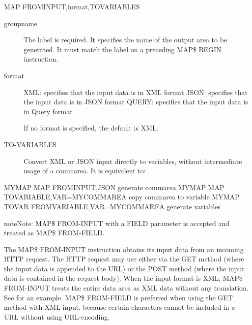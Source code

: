 \documentclass[letterpaper,10pt,english]{sphinxmanual}
\begin{document}
\begin{sphinxVerbatim}[commandchars=\\\{\}]
MAP\PYGZdl{} FROM\PYGZhy{}INPUT,format,TO\PYGZhy{}VARIABLES
\end{sphinxVerbatim}
\begin{description}
\item[{groupname}] \leavevmode
The label is required. It specifies the name of the output area to be generated. It must match the label on a preceding MAP\$ BEGIN instruction.

\item[{format}] \leavevmode
XML: specifies that the input data is in XML format
JSON: specifies that the input data is in JSON format
QUERY: specifies that the input data is in Query format

If no format is specified, the default is XML.

\item[{TO-VARIABLES}] \leavevmode
Convert XML or JSON input directly to variables, without intermediate usage of a commarea. It is equivalent to:

\end{description}

\begin{sphinxVerbatim}[commandchars=\\\{\}]
MYMAP MAP\PYGZdl{} FROM\PYGZhy{}INPUT,JSON generate commarea
MYMAP MAP\PYGZdl{} TO\PYGZhy{}VARIABLE,VAR=\PYGZsq{}MYCOMMAREA\PYGZsq{} copy commarea to variable
MYMAP TOVAR\PYGZdl{} FROM\PYGZhy{}VARIABLE,VAR=\PYGZsq{}MYCOMMAREA\PYGZsq{} generate variables
\end{sphinxVerbatim}

\begin{sphinxadmonition}{note}{Note:}
MAP\$ FROM-INPUT with a FIELD parameter is accepted and treated as MAP\$ FROM-FIELD.
\end{sphinxadmonition}

The MAP\$ FROM-INPUT instruction obtains its input data from an incoming HTTP request. The HTTP request may use either via the GET method (where the input data is appended to the URL) or the POST method (where the input data is contained in the request body). When the input format is XML, MAP\$ FROM-INPUT treats the entire data area as XML data without any translation. See {\hyperref[\detokenize{User_Guide:v457ug-xml-input-data}]{}} for an example. MAP\$ FROM-FIELD is preferred when using the GET method with XML input, because certain characters cannot be included in a URL without using URL-encoding.
\end{document}
